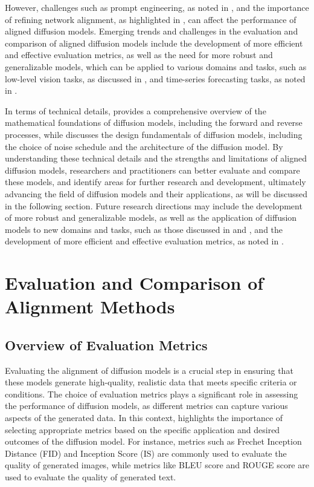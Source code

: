 \documentclass[11pt,a4paper]{article}
\begin{document}
However, challenges such as prompt engineering, as noted in \cite{arxiv:2211.15462}, and the importance of refining network alignment, as highlighted in \cite{doi:10.1137/1.9781611976700.20}, can affect the performance of aligned diffusion models. Emerging trends and challenges in the evaluation and comparison of aligned diffusion models include the development of more efficient and effective evaluation metrics, as well as the need for more robust and generalizable models, which can be applied to various domains and tasks, such as low-level vision tasks, as discussed in \cite{doi:10.1109/tpami.2025.3545047}, and time-series forecasting tasks, as noted in \cite{arxiv:2401.03006}.

In terms of technical details, \cite{doi:10.1145/3626235} provides a comprehensive overview of the mathematical foundations of diffusion models, including the forward and reverse processes, while \cite{arxiv:2306.04542} discusses the design fundamentals of diffusion models, including the choice of noise schedule and the architecture of the diffusion model. By understanding these technical details and the strengths and limitations of aligned diffusion models, researchers and practitioners can better evaluate and compare these models, and identify areas for further research and development, ultimately advancing the field of diffusion models and their applications, as will be discussed in the following section. Future research directions may include the development of more robust and generalizable models, as well as the application of diffusion models to new domains and tasks, such as those discussed in \cite{arxiv:2410.04738} and \cite{arxiv:2405.03150}, and the development of more efficient and effective evaluation metrics, as noted in \cite{arxiv:2410.00083}.


\section{Evaluation and Comparison of Alignment Methods}



\subsection{Overview of Evaluation Metrics}


Evaluating the alignment of diffusion models is a crucial step in ensuring that these models generate high-quality, realistic data that meets specific criteria or conditions. The choice of evaluation metrics plays a significant role in assessing the performance of diffusion models, as different metrics can capture various aspects of the generated data. In this context, \cite{doi:10.1109/tpami.2023.3261988} highlights the importance of selecting appropriate metrics based on the specific application and desired outcomes of the diffusion model. For instance, metrics such as Frechet Inception Distance (FID) and Inception Score (IS) are commonly used to evaluate the quality of generated images, while metrics like BLEU score and ROUGE score are used to evaluate the quality of generated text.
\end{document}

